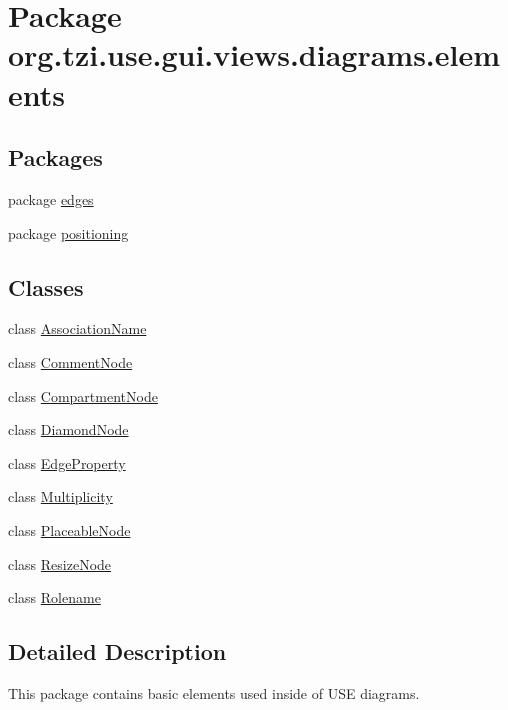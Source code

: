 \hypertarget{namespaceorg_1_1tzi_1_1use_1_1gui_1_1views_1_1diagrams_1_1elements}{\section{Package org.\-tzi.\-use.\-gui.\-views.\-diagrams.\-elements}
\label{namespaceorg_1_1tzi_1_1use_1_1gui_1_1views_1_1diagrams_1_1elements}
}
\subsection*{Packages}
\begin{DoxyCompactItemize}
\item 
package \hyperlink{namespaceorg_1_1tzi_1_1use_1_1gui_1_1views_1_1diagrams_1_1elements_1_1edges}{edges}
\item 
package \hyperlink{namespaceorg_1_1tzi_1_1use_1_1gui_1_1views_1_1diagrams_1_1elements_1_1positioning}{positioning}
\end{DoxyCompactItemize}
\subsection*{Classes}
\begin{DoxyCompactItemize}
\item 
class \hyperlink{classorg_1_1tzi_1_1use_1_1gui_1_1views_1_1diagrams_1_1elements_1_1_association_name}{Association\-Name}
\item 
class \hyperlink{classorg_1_1tzi_1_1use_1_1gui_1_1views_1_1diagrams_1_1elements_1_1_comment_node}{Comment\-Node}
\item 
class \hyperlink{classorg_1_1tzi_1_1use_1_1gui_1_1views_1_1diagrams_1_1elements_1_1_compartment_node}{Compartment\-Node}
\item 
class \hyperlink{classorg_1_1tzi_1_1use_1_1gui_1_1views_1_1diagrams_1_1elements_1_1_diamond_node}{Diamond\-Node}
\item 
class \hyperlink{classorg_1_1tzi_1_1use_1_1gui_1_1views_1_1diagrams_1_1elements_1_1_edge_property}{Edge\-Property}
\item 
class \hyperlink{classorg_1_1tzi_1_1use_1_1gui_1_1views_1_1diagrams_1_1elements_1_1_multiplicity}{Multiplicity}
\item 
class \hyperlink{classorg_1_1tzi_1_1use_1_1gui_1_1views_1_1diagrams_1_1elements_1_1_placeable_node}{Placeable\-Node}
\item 
class \hyperlink{classorg_1_1tzi_1_1use_1_1gui_1_1views_1_1diagrams_1_1elements_1_1_resize_node}{Resize\-Node}
\item 
class \hyperlink{classorg_1_1tzi_1_1use_1_1gui_1_1views_1_1diagrams_1_1elements_1_1_rolename}{Rolename}
\end{DoxyCompactItemize}


\subsection{Detailed Description}
This package contains basic elements used inside of U\-S\-E diagrams. 